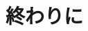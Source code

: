 \documentclass[a4paper,11pt,oneside,openany]{jsbook}
\begin{document}







\chapter{終わりに}
\end{document}
